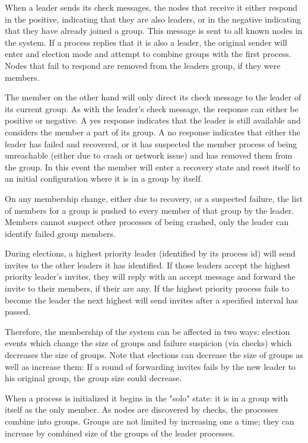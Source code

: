 When a leader sends its check messages, the nodes that receive it either 
respond in the positive, indicating that they are also leaders, or in the 
negative indicating that they have already joined a group. This message is sent 
to all known nodes in the system. If a process replies that it is also a 
leader, the original sender will enter and election mode and attempt to combine 
groups with the first process. Nodes that fail to respond are removed from the 
leaders group, if they were members.

The member on the other hand will only direct its check message to the leader 
of its current group. As with the leader's check message, the response can 
either be positive or negative. A yes response indicates that the leader is 
still available and considers the member a part of its group. A no response 
indicates that either the leader has failed and recovered, or it has suspected 
the member process of being unreachable (either due to crash or network issue) 
and has removed them from the group. In this event the member will enter a 
recovery state and reset itself to an initial configuration where it is in a 
group by itself.

On any membership change, either due to recovery, or a suspected failure, the 
list of members for a group is pushed to every member of that group by the 
leader. Members cannot suspect other processes of being crashed, only the 
leader can identify failed group members.

During elections, a highest priority leader (identified by its process id) will 
send invites to the other leaders it has identified. If those leaders accept 
the highest priority leader's invites, they will reply with an accept message 
and forward the invite to their members, if their are any. If the highest 
priority process fails to become the leader the next highest will send invites 
after a specified interval has passed.

Therefore, the membership of the system can be affected in two ways: election 
events which change the size of groups and failure suspicion (via checks) which 
decreases the size of groups. Note that elections can decrease the size of 
groups as well as increase them: If a round of forwarding invites fails by the 
new leader to his original group, the group size could decrease.

When a process is initialized it begins in the "solo" state: it is in a group 
with itself as the only member. As nodes are discovered by checks, the 
processes combine into groups. Groups are not limited by increasing one a time; 
they can increase by combined size of the groups of the leader processes.

